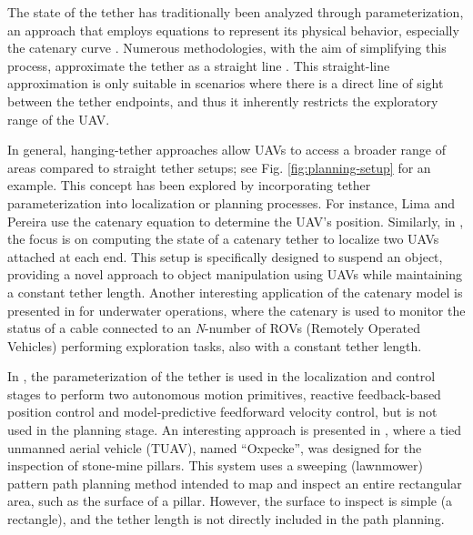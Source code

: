 The state of the tether has traditionally been analyzed through parameterization, an approach that employs equations to represent its physical behavior, especially the catenary curve \cite{BOOKOFCURVES}. Numerous methodologies, with the aim of simplifying this process, approximate the tether as a straight line \cite{autonomousvisual}\cite{framworktether}\cite{uavfire}. This straight-line approximation is only suitable in scenarios where there is a direct line of sight between the tether endpoints, and thus it inherently restricts the exploratory range of the UAV.

In general, hanging-tether approaches allow UAVs to access a broader range of areas compared to straight tether setups; see Fig. \ref{fig:planning-setup} for an example. This concept has been explored by incorporating tether parameterization into localization or planning processes. For instance, Lima and Pereira \cite{9476778} use the catenary equation to determine the UAV's position.  %
Similarly, in \cite{9364354}, the focus is on computing the state of a catenary tether to localize two UAVs attached at each end. This setup is specifically designed to suspend an object, providing a novel approach to object manipulation using UAVs while maintaining a constant tether length. Another interesting application of the catenary model is presented in \cite{LARANJEIRA2020107018} for underwater operations, where the catenary is used to monitor the status of a cable connected to an \emph{N}-number of ROVs (Remotely Operated Vehicles) performing exploration tasks, also with a constant tether length.

In \cite{8848946}, the parameterization of the tether is used in the localization and control stages to perform two autonomous motion primitives, reactive feedback-based position control and model-predictive feedforward velocity control, but is not used in the planning stage. An interesting approach is presented in \cite{drones7020073}, where a tied unmanned aerial vehicle (TUAV), named ``Oxpecke'', was designed for the inspection of stone-mine pillars. This system uses a sweeping (lawnmower) pattern path planning method intended to map and inspect an entire rectangular area, such as the surface of a pillar. However, the surface to inspect is simple (a rectangle), and the tether length is not directly included in the path planning.

